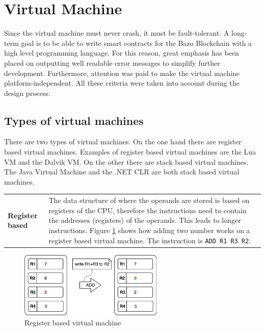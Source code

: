 \section{Virtual Machine}
Since the virtual machine must never crash, it must be fault-tolerant. A long-term goal is to be able to write smart contracts for the Bazo Blockchain with a high level programming language. For this reason, great emphasis has been placed on outputting well readable error messages to simplify further development. Furthermore, attention was paid to make the virtual machine platform-independent. All these criteria were taken into account during the design process.

\subsection{Types of virtual machines}
There are two types of virtual machines. On the one hand there are register based virtual machines. Examples of register based virtual machines are the Lua VM and the Dalvik VM. On the other there are stack based virtual machines. The Java Virtual Machine and the .NET CLR are both stack based virtual machines. \cite{stackvsregistervm}

\begin{tabular}[t]{ p{3cm} p{12.5cm}}
\raggedright
\textbf{Register based} &
The data structure of where the operands are stored is based on registers of the CPU, therefore the instructions need to contain the addresses (registers) of the operands. This leads to longer instructions. Figure \ref{register vm} shows how adding two number works on a register based virtual machine. \cite{stackvsregistervm} The instruction is \texttt{ADD R1 R3 R2}.
\end{tabular}
\begin{figure}[H]
	\begin{center}
	\includegraphics[width=0.61\textwidth]{./images/register-example}
	\caption{Register based virtual machine}
	\label{register vm}
	\end{center}
\end{figure}

